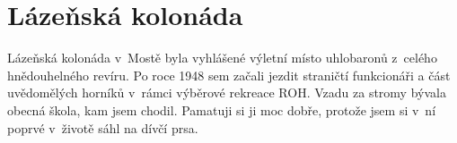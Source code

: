 
\chapter{Lázeňská kolonáda}


Lázeňská kolonáda v~Mostě byla vyhlášené výletní místo uhlobaronů z~celého
hnědouhelného revíru. Po roce 1948 sem začali jezdit straničtí funkcionáři a
část uvědomělých horníků v~rámci výběrové rekreace ROH. Vzadu za stromy bývala
obecná škola, kam jsem chodil. Pamatuji si ji moc dobře, protože jsem si v~ní
poprvé v~životě sáhl na dívčí prsa.
